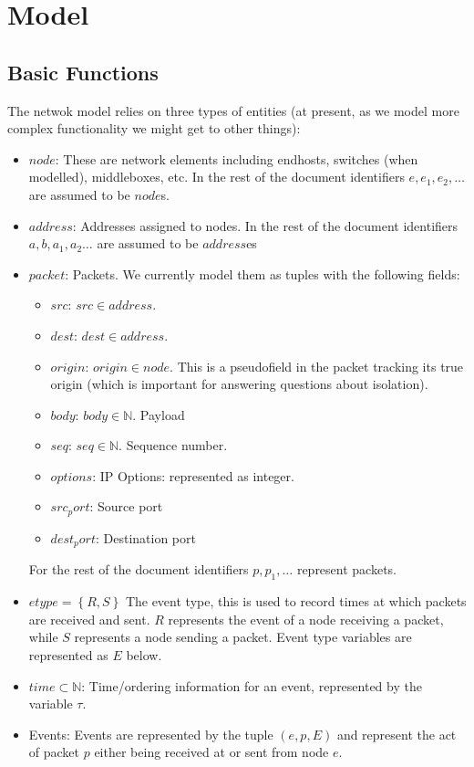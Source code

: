 \section{Model}
\subsection{Basic Functions}
The netwok model relies on three types of entities (at present, as we model more complex functionality we might get to
other things):

\begin{itemize}
\item $node$: These are network elements including endhosts, switches (when modelled), middleboxes, etc. In the rest of
the document identifiers $e, e_1, e_2, \ldots$ are assumed to be $node$s.
\item $address$: Addresses assigned to nodes. In the rest of the document identifiers $a, b, a_1, a_2\ldots$ are assumed
to be $address$es
\item $packet$: Packets. We currently model them as tuples with the following fields:
\begin{itemize}
\item $src$: $src\in address$.
\item $dest$: $dest\in address$.
\item $origin$: $origin\in node$. This is a pseudofield in the packet tracking its true origin (which is important for
answering questions about isolation).
\item $body$: $body\in \mathbb{N}$. Payload 
\item $seq$: $seq\in \mathbb{N}$. Sequence number.
\item $options$: IP Options: represented as integer.
\item $src_port$: Source port
\item $dest_port$: Destination port
\end{itemize}
For the rest of the document identifiers $p, p_1,\ldots$ represent packets.
\item $etype = \left\{R, S\right\}$ The event type, this is used to record times at which packets are received and sent. $R$ represents
the event of a node receiving a packet, while $S$ represents a node sending a packet. Event type variables are represented as $E$ below.
\item $time \subset \mathbb{N}$: Time/ordering information for an event, represented by the variable $\tau$.
\item Events: Events are represented by the tuple $\left( e, p, E \right)$ and represent the act of packet $p$ either being received at or
sent from node $e$.
\end{itemize}

